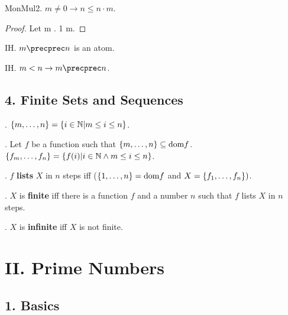 \begin{axiom}
\begin{lemma}
\begin{lemma} MonMul2. $m \neq 0 \rightarrow n \leq n \cdot m$.
\end{lemma}
\begin{proof}
Let m .
1 \leq m.
\end{proof}

\begin{signature} IH. $m \precprec n$ is an atom.
\end{signature}

\begin{axiom} IH. $m < n \rightarrow m \precprec n$. \end{axiom}

\subsection{4. Finite Sets and Sequences}

\begin{definition}. 
$\{m,\dots,n\} = \{ i \in {\Bbb N} | m \leq i \leq n \}$.
\end{definition}


\begin{definition}. 
Let $f$ be a function such that 
$\{m,\dots,n\} \subseteq \text{dom} f$. 
$\{f_{m},\dots,f_{n}\} = \{ f(i) | i \in {\Bbb N} \wedge m \leq i \leq n \}$.
\end{definition}

\begin{definition}. $f$ {\bf lists} $X$ in $n$ steps iff 
($\{1,\dots,n\} = \text{dom} f$ and $X = \{f_{1},\dots,f_{n}\})$.
\end{definition}

\begin{definition}. $X$ is {\bf finite} iff there is a function
$f$ and a number $n$ such that $f$ lists $X$ in $n$ steps.
\end{definition}

\begin{definition}. $X$ is {\bf infinite} iff $X$ is not finite.

\section{II. Prime Numbers}

\subsection{1. Basics}


\end{definition}
\end{lemma}
\end{axiom}
